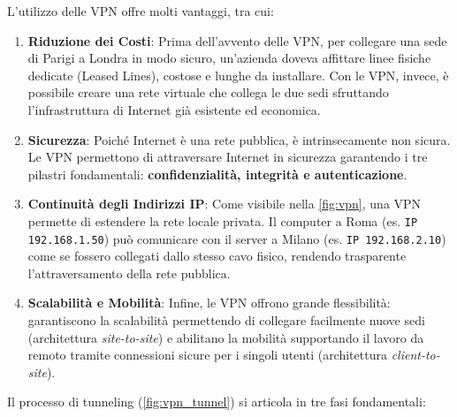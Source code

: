 \documentclass[a4paper, 11pt]{article}
\begin{document}
L'utilizzo delle VPN offre molti vantaggi, tra cui:

\begin{enumerate}
    \item \textbf{Riduzione dei Costi}: Prima dell'avvento delle VPN, per collegare una sede di Parigi a Londra in modo sicuro, un'azienda doveva affittare linee fisiche dedicate (Leased Lines), costose e lunghe da installare. Con le VPN, invece, è possibile creare una rete virtuale che collega le due sedi sfruttando l'infrastruttura di Internet già esistente ed economica.
    \item \textbf{Sicurezza}: Poiché Internet è una rete pubblica, è intrinsecamente non sicura. Le VPN permettono di attraversare Internet in sicurezza garantendo i tre pilastri fondamentali: \textbf{confidenzialità, integrità e autenticazione}.
    \item \textbf{Continuità degli Indirizzi IP}: Come visibile nella \autoref{fig:vpn}, una VPN permette di estendere la rete locale privata. Il computer a Roma (es. \texttt{IP 192.168.1.50}) può comunicare con il server a Milano (es. \texttt{IP 192.168.2.10}) come se fossero collegati dallo stesso cavo fisico, rendendo trasparente l'attraversamento della rete pubblica.
    \item \textbf{Scalabilità e Mobilità}: Infine, le VPN offrono grande flessibilità: garantiscono la scalabilità permettendo di collegare facilmente nuove sedi (architettura \textit{site-to-site}) e abilitano la mobilità supportando il lavoro da remoto tramite connessioni sicure per i singoli utenti (architettura \textit{client-to-site}).
\end{enumerate}

Il processo di tunneling (\autoref{fig:vpn_tunnel}) si articola in tre fasi fondamentali:
\end{document}

